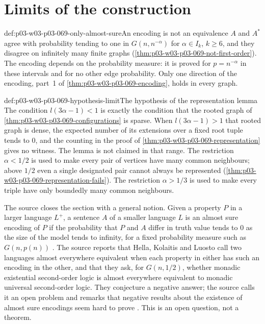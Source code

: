 \section{Limits of the construction}
\label{sec:p03-w03-p03-069-limits}

\begin{hbwarning}{def:p03-w03-p03-069-only-almost-sure}{An encoding is not an equivalence}
\(A\) and \(A^*\) agree with probability tending to one in
\(G(n,n^{-\alpha})\) for \(\alpha\in I_k\), \(k\geq6\), and they disagree on
infinitely many finite graphs (\cref{thm:p03-w03-p03-069-not-first-order}).
The encoding depends on the probability measure: it is proved for
\(p=n^{-\alpha}\) in these intervals and for no other edge probability.  Only
one direction of the encoding, part~1 of
\cref{thm:p03-w03-p03-069-encoding}, holds in every graph.
\end{hbwarning}

\begin{hbwarning}{def:p03-w03-p03-069-hypothesis-limit}{The hypothesis of the representation lemma}
The condition \(l(3\alpha-1)<1\) is exactly the condition that the rooted
graph of \cref{thm:p03-w03-p03-069-configurations} is sparse.  When
\(l(3\alpha-1)>1\) that rooted graph is dense, the expected number of its
extensions over a fixed root tuple tends to \(0\), and the counting in the
proof of \cref{thm:p03-w03-p03-069-representation} gives no witness.  The
lemma is not claimed in that range.  The restriction \(\alpha<1/2\) is used
to make every pair of vertices have many common neighbours; above \(1/2\) even
a single designated pair cannot always be represented
(\cref{thm:p03-w03-p03-069-representation-fails}).  The restriction
\(\alpha>1/3\) is used to make every triple have only boundedly many common
neighbours.
\end{hbwarning}

The source closes the section with a general notion.  Given a property \(P\)
in a larger language \(L^+\), a sentence \(A\) of a smaller language \(L\)
is an almost sure encoding of \(P\) if the probability that \(P\) and \(A\)
differ in truth value tends to \(0\) as the size of the model tends to
infinity, for a fixed probability measure such as \(G(n,p(n))\)
\cite[p.~18]{Spencer2007LogicRandomStructuresAuthor}.  The source reports
that Hella, Kolaitis and Luosto call two languages almost everywhere
equivalent when each property in either has such an encoding in the other,
and that they ask, for \(G(n,1/2)\), whether monadic existential second-order
logic is almost everywhere equivalent to monadic universal second-order
logic.  They conjecture a negative answer; the source calls it an open
problem and remarks that negative results about the existence of almost sure
encodings seem hard to prove \cite[p.~18]{Spencer2007LogicRandomStructuresAuthor}.
This is an open question, not a theorem.

